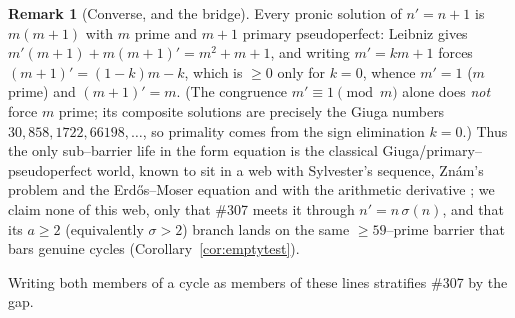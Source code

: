 \documentclass[11pt]{article}
\theoremstyle{definition}
\newtheorem{remark}[theorem]{Remark}
\begin{document}
\begin{remark}[Converse, and the bridge]
Every pronic solution of $n'=n+1$ is $m(m+1)$ with $m$ prime and $m+1$ primary pseudoperfect: Leibniz
gives $m'(m+1)+m(m+1)'=m^2+m+1$, and writing $m'=km+1$ forces $(m+1)'=(1-k)m-k$, which is $\ge0$ only for
$k=0$, whence $m'=1$ ($m$ prime) and $(m+1)'=m$. (The congruence $m'\equiv1\pmod m$ alone does \emph{not}
force $m$ prime; its composite solutions are precisely the Giuga numbers $30,858,1722,66198,\dots$,
so primality comes from the sign elimination $k=0$.) Thus the only sub--barrier life in the form equation
is the classical Giuga/primary--pseudoperfect world, known to sit in a web with Sylvester's sequence,
Zn\'am's problem and the Erd\H{o}s--Moser equation \cite{SondowMacMillan2017} and with the arithmetic
derivative \cite{GrauOllerMarcen2012,GrauOllerMarcenSadornil2021}; we claim none of this web, only that
\#307 meets it through $n'=n\,\sigma(n)$, and that its $a\ge2$ (equivalently $\sigma>2$) branch lands on
the same $\ge59$--prime barrier \cite{BorweinWong1997} that bars genuine cycles
(Corollary~\ref{cor:emptytest}).
\end{remark}

Writing both members of a cycle as members of these lines stratifies \#307 by the gap.
\end{document}
